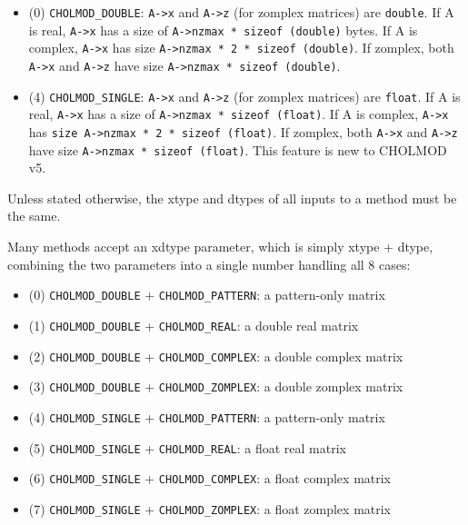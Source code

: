 \documentclass[11pt]{article}
\begin{document}
    \begin{itemize}
        \item
        (0) \verb'CHOLMOD_DOUBLE':     \verb'A->x' and \verb'A->z' (for zomplex
        matrices) are \verb'double'.  If A is real, \verb'A->x' has a size of
        \verb'A->nzmax * sizeof (double)' bytes.  If A is complex, \verb'A->x'
        has size \verb'A->nzmax * 2 * sizeof (double)'.
        If zomplex, both \verb'A->x' and \verb'A->z' have size
        \verb'A->nzmax * sizeof (double)'.

        \item
        (4) \verb'CHOLMOD_SINGLE':     \verb'A->x' and \verb'A->z' (for zomplex
        matrices) are \verb'float'.  If A is real, \verb'A->x' has a size of
        \verb'A->nzmax * sizeof (float)'.  If A is complex, \verb'A->x' has
        \verb'size A->nzmax * 2 * sizeof (float)'.
        If zomplex, both \verb'A->x' and \verb'A->z' have size
        \verb'A->nzmax * sizeof (float)'.
        This feature is new to CHOLMOD v5.
    \end{itemize}

   Unless stated otherwise, the xtype and dtypes of all inputs to a method must
   be the same.

   Many methods accept an xdtype parameter, which is simply xtype + dtype,
   combining the two parameters into a single number handling all 8 cases:

    \begin{itemize}
    \item
    (0) \verb'CHOLMOD_DOUBLE' + \verb'CHOLMOD_PATTERN':  a pattern-only matrix
    \item
    (1) \verb'CHOLMOD_DOUBLE' + \verb'CHOLMOD_REAL':     a double real matrix
    \item
    (2) \verb'CHOLMOD_DOUBLE' + \verb'CHOLMOD_COMPLEX':  a double complex matrix
    \item
    (3) \verb'CHOLMOD_DOUBLE' + \verb'CHOLMOD_ZOMPLEX':  a double zomplex matrix
    \item
    (4) \verb'CHOLMOD_SINGLE' + \verb'CHOLMOD_PATTERN':  a pattern-only matrix
    \item
    (5) \verb'CHOLMOD_SINGLE' + \verb'CHOLMOD_REAL':     a float real matrix
    \item
    (6) \verb'CHOLMOD_SINGLE' + \verb'CHOLMOD_COMPLEX':  a float complex matrix
    \item
    (7) \verb'CHOLMOD_SINGLE' + \verb'CHOLMOD_ZOMPLEX':  a float zomplex matrix
    \end{itemize}
\end{document}
